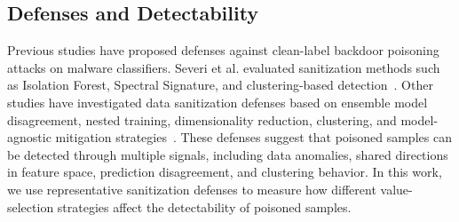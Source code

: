 \subsection{Defenses and Detectability}
Previous studies have proposed defenses against clean-label backdoor poisoning attacks on malware classifiers.
Severi et al. evaluated sanitization methods such as Isolation Forest, Spectral Signature, and clustering-based detection~\cite{severi}.
Other studies have investigated data sanitization defenses based on ensemble model disagreement, nested training, dimensionality reduction, clustering, and model-agnostic mitigation strategies~\cite{ho_sanitization,venkatesan_nids,countermeasures,model_agnostic_mitigation,reddy_improved_nt,partition,yudin_retraining}.
These defenses suggest that poisoned samples can be detected through multiple signals, including data anomalies, shared directions in feature space, prediction disagreement, and clustering behavior.
In this work, we use representative sanitization defenses to measure how different value-selection strategies affect the detectability of poisoned samples.
